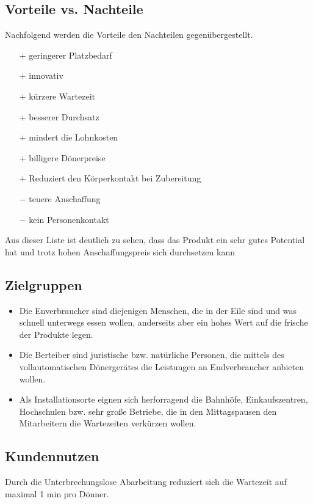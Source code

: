 \subsection{Vorteile vs. Nachteile}
Nachfolgend werden die Vorteile den Nachteilen gegenübergestellt.
\begin{itemize}
  \item[$+$] geringerer Platzbedarf
  \item[$+$] innovativ
  \item[$+$] kürzere Wartezeit
  \item[$+$] besserer Durchsatz
  \item[$+$] mindert die Lohnkosten
  \item[$+$] billigere Dönerpreise
  \item[$+$] Reduziert den Körperkontakt bei Zubereitung\\
  \item[$-$] teuere Anschaffung
  \item[$-$] kein Personenkontakt
\end{itemize}
Aus dieser Liste ist deutlich zu sehen, dass das Produkt ein sehr gutes Potential hat
und trotz hohen Anschaffungspreis sich durchsetzen kann
\subsection{Zielgruppen}
\begin{itemize}
	\item Die Enverbraucher sind diejenigen Menschen, die in der Eile sind und was schnell
		unterwegs essen wollen, anderseits aber ein hohes Wert auf die frische der
		Produkte legen.
	\item Die Berteiber sind juristische bzw. natürliche Personen, die mittels des
		vollautomatischen Dönergerätes die Leistungen an Endverbraucher anbieten wollen.
	\item Als Installationsorte eignen sich herforragend die Bahnhöfe, Einkaufszentren,
		Hochschulen bzw. sehr große Betriebe, die in den Mittagspausen den Mitarbeitern 
		die Wartezeiten verkürzen wollen.
\end{itemize}




\subsection{Kundennutzen}
Durch die Unterbrechungslose Abarbeitung reduziert sich die Wartezeit auf maximal 1 min pro Dönner.
